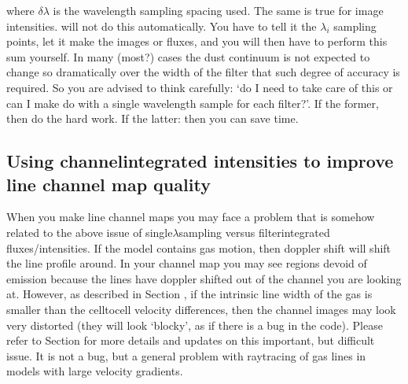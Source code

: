 \documentclass[letterpaper,10pt,english]{sphinxmanual}
\begin{document}
where \(\delta\lambda\) is the wavelength sampling spacing used. The same is
true for image intensities.  will not do this
automatically. You have to tell it the \(\lambda_i\) sampling points, let it
make the images or fluxes, and you will then have to perform this sum
yourself.  In many (most?)
cases the dust continuum is not expected to change so dramatically over the
width of the filter that such degree of accuracy is required. So you are
advised to think carefully: ‘do I need to take care of this or can I make
do with a single wavelength sample for each filter?’. If the former, then
do the hard work. If the latter: then you can save time.


\subsection{Using channel\sphinxhyphen{}integrated intensities to improve line channel map quality}
\label{\detokenize{imagesspectra:using-channel-integrated-intensities-to-improve-line-channel-map-quality}}\label{\detokenize{imagesspectra:sec-wavelength-bands-subsec}}
When you make line channel maps you may face a problem that is somehow
related to the above issue of single\sphinxhyphen{}\(\lambda\)\sphinxhyphen{}sampling versus
filter\sphinxhyphen{}integrated fluxes/intensities. If the model contains gas motion, then
doppler shift will shift the line profile around. In your channel map you
may see regions devoid of emission because the lines have doppler shifted
out of the channel you are looking at. However, as described in Section
{\hyperref[\detokenize{lineradtrans:sec-lines-pitfalls}]{}}, if the intrinsic line width of the gas is smaller
than the cell\sphinxhyphen{}to\sphinxhyphen{}cell velocity differences, then the channel images may look
very distorted (they will look ‘blocky’, as if there is a bug in the
code). Please refer to Section {\hyperref[\detokenize{lineradtrans:sec-lines-pitfalls}]{}} for more details and
updates on this important, but difficult issue. It is not a bug, but a
general problem with ray\sphinxhyphen{}tracing of gas lines in models with large velocity
gradients.
\end{document}
